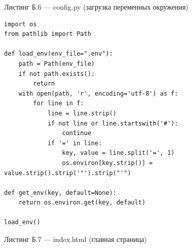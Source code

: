 \documentclass[14pt, a4paper]{extarticle}
\begin{document}
\newpage


Листинг Б.6 — config.py (загрузка переменных окружения)

\begin{verbatim}
import os
from pathlib import Path

def load_env(env_file=".env"):
    path = Path(env_file)
    if not path.exists():
        return
    with open(path, 'r', encoding='utf-8') as f:
        for line in f:
            line = line.strip()
            if not line or line.startswith('#'):
                continue
            if '=' in line:
                key, value = line.split('=', 1)
                os.environ[key.strip()] = value.strip().strip('"').strip("'")

def get_env(key, default=None):
    return os.environ.get(key, default)

load_env()
\end{verbatim}

\newpage


Листинг Б.7 — index.html (главная страница)
\end{document}
